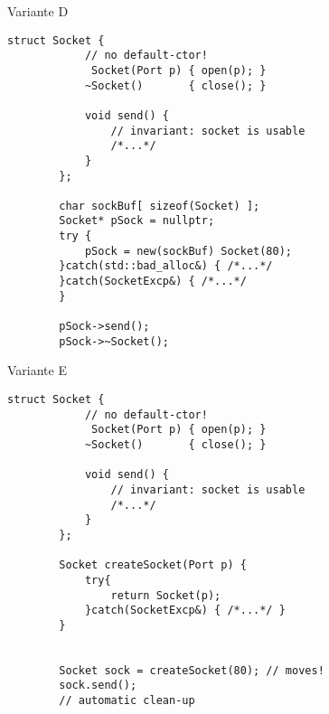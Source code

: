 \begin{frame}[t, fragile]{ Variante D }
	\begin{lstlisting}[basicstyle=\scriptsize]
		struct Socket {
			// no default-ctor!
			 Socket(Port p) { open(p); }
			~Socket()       { close(); }
			
			void send() {
				// invariant: socket is usable
				/*...*/
			}
		};
		
		char sockBuf[ sizeof(Socket) ];
		Socket* pSock = nullptr;
		try {
			pSock = new(sockBuf) Socket(80);
		}catch(std::bad_alloc&) { /*...*/
		}catch(SocketExcp&) { /*...*/
		}
		
		pSock->send();
		pSock->~Socket();
	\end{lstlisting}
\end{frame}

\begin{frame}[t, fragile]{ Variante E }
	\begin{lstlisting}[basicstyle=\scriptsize]
		struct Socket {
			// no default-ctor!
			 Socket(Port p) { open(p); }
			~Socket()       { close(); }
			
			void send() {
				// invariant: socket is usable
				/*...*/
			}
		};
		
		Socket createSocket(Port p) {
			try{
				return Socket(p);
			}catch(SocketExcp&) { /*...*/ }
		}
		
		
		Socket sock = createSocket(80);	// moves!
		sock.send();
		// automatic clean-up
	\end{lstlisting}
\end{frame}

